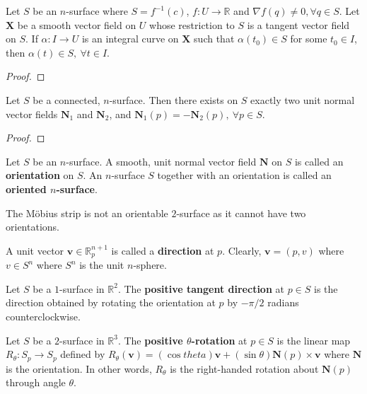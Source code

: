 \begin{corollary}
	Let $S$ be an $n$-surface where $S = f^{-1}(c)$, $f : U \to \mathbb{R}$ and $\nabla f(q) \ne 0,\forall q \in S$. Let $\boldsymbol{X}$ be a smooth vector field on $U$ whose restriction to $S$ is a tangent vector field on $S$. If $\alpha : I \to U$ is an integral curve on $\boldsymbol{X}$ such that $\alpha(t_0) \in S$ for some $t_0 \in I$, then $\alpha(t) \in S,\ \forall t \in I$.
\end{corollary}
\begin{proof}
\end{proof}

\begin{theorem}[orientation]
	Let $S$ be a connected, $n$-surface. Then there exists on $S$ exactly two unit normal vector fields $\boldsymbol{N}_1$ and $\boldsymbol{N}_2$, and $\boldsymbol{N}_1(p) = -\boldsymbol{N}_2(p),\ \forall p \in S$.
\end{theorem}
\begin{proof}
\end{proof}

\begin{definition}
	Let $S$ be an $n$-surface.
	A smooth, unit normal vector field $\boldsymbol{N}$ on $S$ is called an \textbf{orientation} on $S$.
	An $n$-surface $S$ together with an orientation is called an \textbf{oriented $n$-surface}.
\end{definition}

\begin{remark}
	The M\"obius strip is not an orientable $2$-surface as it cannot have two orientations.
\end{remark}

\begin{definition}
	A unit vector $\boldsymbol{v} \in \mathbb{R}_p^{n+1}$ is called a \textbf{direction} at $p$. Clearly, $\boldsymbol{v} = (p,v)$ where $v \in S^n$ where $S^n$ is the unit $n$-sphere.
\end{definition}

\begin{definition}
	Let $S$ be a $1$-surface in $\mathbb{R}^2$.
	The \textbf{positive tangent direction} at $p \in S$ is the direction obtained by rotating the orientation at $p$ by $-\pi/2$ radians counterclockwise.
\end{definition}

\begin{definition}
	Let $S$ be a $2$-surface in $\mathbb{R}^3$.
	The \textbf{positive $\theta$-rotation} at $p \in S$ is the linear map $R_\theta : S_p \to S_p$ defined by $R_\theta(\boldsymbol{v}) = (\cos theta)\boldsymbol{v} + (\sin \theta) \boldsymbol{N}(p) \times \boldsymbol{v}$ where $\boldsymbol{N}$ is the orientation.
	In other words, $R_\theta$ is the right-handed rotation about $\boldsymbol{N}(p)$ through angle $\theta$.
\end{definition}

